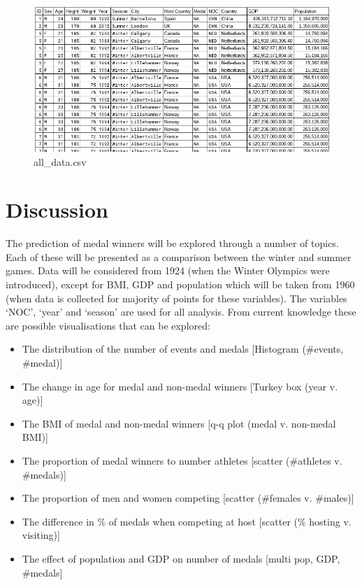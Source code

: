 \documentclass[a4 paper, 12pt]{article}
\begin{document}
        \begin{figure} [H]
            \centering
            \includegraphics[width=\textwidth, frame]
                {../images/new_data.png}     
            \caption{all\_data.csv}               
        \end{figure} 


\section{Discussion}
The prediction of medal winners will be explored through a number of topics. Each of these will be presented as a comparison between the winter and summer games. Data will be considered from 1924 (when the Winter Olympics were introduced), except for BMI, GDP and population which will be taken from 1960 (when data is collected for majority of points for these variables). The variables ‘NOC’, ‘year’ and ‘season’ are used for all analysis. From current knowledge these are possible visualisations that can be explored:
    \begin{itemize}
        \item The distribution of the number of events and medals [Histogram (\#events, \#medal)]
        \item The change in age for medal and non-medal winners [Turkey box (year v. age)]
        \item The BMI of medal and non-medal winners [q-q plot (medal v. non-medal BMI)]
        \item The proportion of medal winners to number athletes [scatter (\#athletes v. \#medals)]
        \item The proportion of men and women competing [scatter (\#females v. \#males)]
        \item The difference in \% of medals when competing at host [scatter (\% hosting v. visiting)]
        \item The effect of population and GDP on number of medals [multi \- pop, GDP, \#medals]
    \end{itemize}
\end{document}
